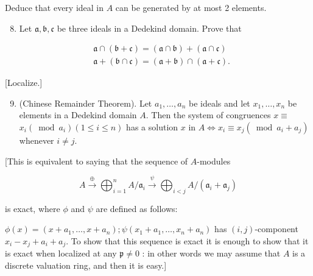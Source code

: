 \documentclass{standalone}
\theoremstyle{definition}
\theoremstyle{remark}
\begin{document}
Deduce that every ideal in $A$ can be generated by at most 2 elements.

\begin{enumerate}
  \setcounter{enumi}{7}
  \item Let $\mathfrak{a}, \mathfrak{b}, \mathfrak{c}$ be three ideals in a Dedekind domain. Prove that
\end{enumerate}

\[
\begin{aligned}
& \mathfrak{a} \cap(\mathfrak{b}+\mathfrak{c})=(\mathfrak{a} \cap \mathfrak{b})+(\mathfrak{a} \cap \mathfrak{c}) \\
& \mathfrak{a}+(\mathfrak{b} \cap \mathfrak{c})=(\mathfrak{a}+\mathfrak{b}) \cap(\mathfrak{a}+\mathfrak{c}) .
\end{aligned}
\]

[Localize.]

\begin{enumerate}
  \setcounter{enumi}{8}
  \item (Chinese Remainder Theorem). Let $a_{1}, \ldots, a_{n}$ be ideals and let $x_{1}, \ldots, x_{n}$ be elements in a Dedekind domain $A$. Then the system of congruences $x \equiv$ $x_{i}\left(\bmod a_{i}\right)(1 \leqslant i \leqslant n)$ has a solution $x$ in $A \Leftrightarrow x_{i} \equiv x_{j}\left(\bmod a_{i}+a_{j}\right)$ whenever $i \neq j$.
\end{enumerate}

[This is equivalent to saying that the sequence of $A$-modules

\[
A \stackrel{\oplus}{\rightarrow} \bigoplus_{i=1}^{n} A / \mathfrak{a}_{i} \stackrel{\psi}{\rightarrow} \bigoplus_{i<j} A /\left(\mathfrak{a}_{i}+\mathfrak{a}_{j}\right)
\]

is exact, where $\phi$ and $\psi$ are defined as follows:

$\phi(x)=\left(x+a_{1}, \ldots, x+a_{n}\right) ; \psi\left(x_{1}+a_{1}, \ldots, x_{n}+a_{n}\right)$ has $(i, j)$-component $x_{i}-x_{j}+a_{i}+a_{j}$. To show that this sequence is exact it is enough to show that it is exact when localized at any $\mathfrak{p} \neq 0$ : in other words we may assume that $A$ is a discrete valuation ring, and then it is easy.]
\end{document}
